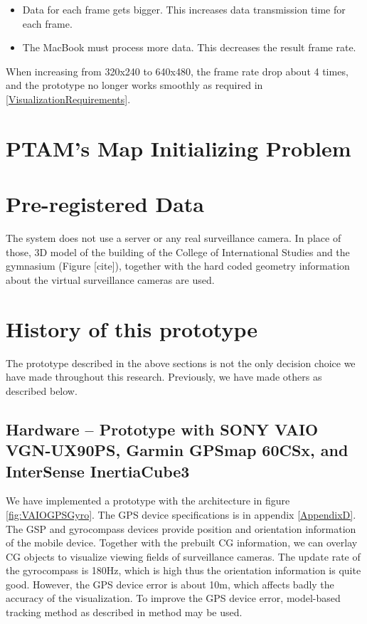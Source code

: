 \begin{itemize}
	\item Data for each frame gets bigger. This increases data transmission time for each frame.
	\item The MacBook must process more data. This decreases the result frame rate.
\end{itemize}

When increasing from 320x240 to 640x480, the frame rate drop about 4 times, and the prototype no longer works smoothly as required in \ref{VisualizationRequirements}. 

\section{PTAM's Map Initializing Problem}

\section{Pre-registered Data}

The system does not use a server or any real surveillance camera. In place of those, 3D model of the building of the College of International Studies and the gymnasium (Figure [cite]), together with the hard coded geometry information about the virtual surveillance cameras are used.

\section{History of this prototype}

The prototype described in the above sections is not the only decision choice we have made throughout this research. Previously, we have made others as described below.

\subsection{Hardware -- Prototype with SONY VAIO VGN-UX90PS, Garmin GPSmap 60CSx, and InterSense InertiaCube3}

We have implemented a prototype with the architecture in figure \ref{fig:VAIOGPSGyro}. The GPS device specifications is in appendix \ref{AppendixD}. The GSP and gyrocompass devices provide position and orientation information of the mobile device. Together with the prebuilt CG information, we can overlay CG objects to visualize viewing fields of surveillance cameras. The update rate of the gyrocompass is 180Hz, which is high thus the orientation information is quite good. However, the GPS device error is about 10m, which affects badly the accuracy of the visualization. To improve the GPS device error, model-based tracking method as described in \citep{Reference13} method may be used.

